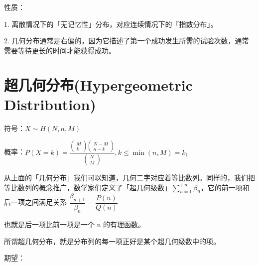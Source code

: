 \documentclass[12pt, a4paper, oneside]{ctexbook}
\begin{document}
 性质：

1. 离散情况下的「无记忆性」分布，对应连续情况下的「指数分布」。

2. 几何分布通常是右偏的，因为它描述了第一个成功发生所需的试验次数，通常需要等待更长的时间才能获得成功。

\section{超几何分布(Hypergeometric Distribution)}

 符号：$X \sim H(N,n,M)$

 概率：$P(X = k) = \frac{\begin{pmatrix} M \\ k\end{pmatrix} \begin{pmatrix} N - M \\ n - k\end{pmatrix}}{\begin{pmatrix} N \\ M\end{pmatrix}}, k \leq \min(n, M) = k_1$

从上面的「几何分布」我们可以知道，几何二字对应着等比数列。同样的，我们把等比数列的概念推广，数学家们定义了「超几何级数」$\sum\limits_{n = 1}^{+\infty} \beta_n$，它的前一项和后一项之间满足关系 $\dfrac{\beta_{n + 1}}{\beta_n} = \dfrac{P(n)}{Q(n)}$

也就是后一项比前一项是一个 n 的有理函数。

所谓超几何分布，就是分布列的每一项正好是某个超几何级数中的项。

 期望：
\end{document}
